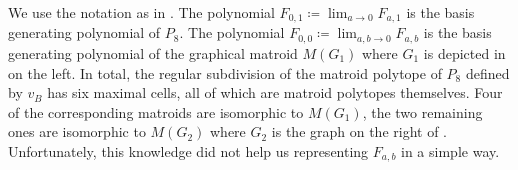 \begin{rem}\label{rem:subd}
    We use the notation as in .
    The polynomial $F_{0,1}\coloneqq \lim_{a\to0}F_{a,1}$ is the basis generating polynomial of $P_8$. The polynomial $F_{0,0}\coloneqq \lim_{a,b\to0}F_{a,b}$ is the basis generating polynomial of the graphical matroid $M(G_1)$ where $G_1$ is depicted in  on the left. In total, the regular subdivision of the matroid polytope of $P_8$ defined by $v_B$ has six maximal cells, all of which are matroid polytopes themselves. Four of the corresponding matroids are isomorphic to $M(G_1)$, the two remaining ones are isomorphic to $M(G_2)$ where $G_2$ is the graph on the right of .
    Unfortunately, this knowledge did not help us representing $F_{a,b}$ in a simple way.
\end{rem}

